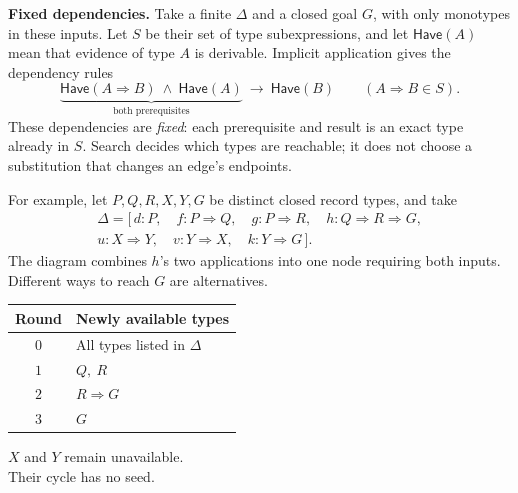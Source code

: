\documentclass[10pt,a4paper]{article}
\newcommand{\kw}[1]{\mathsf{#1}}
\begin{document}
\textbf{Fixed dependencies.}
Take a finite $\Delta$ and a closed goal $G$, with only monotypes in these inputs.
Let $S$ be their set of type subexpressions, and let $\kw{Have}(A)$ mean that
evidence of type $A$ is derivable. Implicit application gives the dependency rules
\[
 \underbrace{\kw{Have}(A\Rightarrow B)\ \land\ \kw{Have}(A)}_{\text{both prerequisites}}
 \ \longrightarrow\ \kw{Have}(B)
 \qquad(A\Rightarrow B\in S).
\]
These dependencies are \emph{fixed}: each prerequisite and result is an exact type
already in $S$. Search decides which types are reachable; it does not choose a
substitution that changes an edge's endpoints.

For example, let $P,Q,R,X,Y,G$ be distinct closed record types, and take
\[
\begin{aligned}
 \Delta=[\,d:P,\quad f:P\Rightarrow Q,\quad g:P\Rightarrow R,\quad
 h:Q\Rightarrow R\Rightarrow G,\\
 u:X\Rightarrow Y,\quad v:Y\Rightarrow X,\quad k:Y\Rightarrow G\,].
\end{aligned}
\]
The diagram combines $h$'s two applications into one node requiring both inputs.
Different ways to reach $G$ are alternatives.
\begin{center}
\begin{minipage}[c]{0.55\linewidth}
\centering
{}
\end{minipage}\hfill
\begin{minipage}[c]{0.42\linewidth}
\centering
\begin{tabular}{@{}cl@{}}
\toprule
Round & Newly available types\\
\midrule
$0$ & All types listed in $\Delta$\\
$1$ & $Q,\ R$\\
$2$ & $R\Rightarrow G$\\
$3$ & $G$\\
\bottomrule
\end{tabular}

\smallskip
$X$ and $Y$ remain unavailable.\\
Their cycle has no seed.
\end{minipage}
\end{center}
\end{document}
